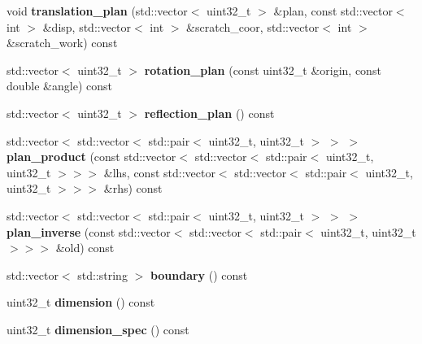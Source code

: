 \begin{DoxyCompactItemize}
void {\bfseries translation\+\_\+plan} (std\+::vector$<$ uint32\+\_\+t $>$ \&plan, const std\+::vector$<$ int $>$ \&disp, std\+::vector$<$ int $>$ \&scratch\+\_\+coor, std\+::vector$<$ int $>$ \&scratch\+\_\+work) const
\item 
\mbox{\label{classqbasis_1_1lattice_ad4f750683c2a56f21ffd395acb1e90f7}} 
std\+::vector$<$ uint32\+\_\+t $>$ {\bfseries rotation\+\_\+plan} (const uint32\+\_\+t \&origin, const double \&angle) const
\item 
\mbox{\label{classqbasis_1_1lattice_a5178ad4d928d458a410defb30b88e750}} 
std\+::vector$<$ uint32\+\_\+t $>$ {\bfseries reflection\+\_\+plan} () const
\item 
\mbox{\label{classqbasis_1_1lattice_ada61775e3ed1bb41bb26c2b20dd0a272}} 
std\+::vector$<$ std\+::vector$<$ std\+::pair$<$ uint32\+\_\+t, uint32\+\_\+t $>$ $>$ $>$ {\bfseries plan\+\_\+product} (const std\+::vector$<$ std\+::vector$<$ std\+::pair$<$ uint32\+\_\+t, uint32\+\_\+t $>$$>$$>$ \&lhs, const std\+::vector$<$ std\+::vector$<$ std\+::pair$<$ uint32\+\_\+t, uint32\+\_\+t $>$$>$$>$ \&rhs) const
\item 
\mbox{\label{classqbasis_1_1lattice_a2bf468a702fce200d990deea197a7306}} 
std\+::vector$<$ std\+::vector$<$ std\+::pair$<$ uint32\+\_\+t, uint32\+\_\+t $>$ $>$ $>$ {\bfseries plan\+\_\+inverse} (const std\+::vector$<$ std\+::vector$<$ std\+::pair$<$ uint32\+\_\+t, uint32\+\_\+t $>$$>$$>$ \&old) const
\item 
\mbox{\label{classqbasis_1_1lattice_a7ea9b7ca95efd6cbb84a03f5e63950d8}} 
std\+::vector$<$ std\+::string $>$ {\bfseries boundary} () const
\item 
\mbox{\label{classqbasis_1_1lattice_a4c06bdbef0aa342f7167cc4dae400bba}} 
uint32\+\_\+t {\bfseries dimension} () const
\item 
\mbox{\label{classqbasis_1_1lattice_a875171b488ac643fb9baffdbf7bb352a}} 
uint32\+\_\+t {\bfseries dimension\+\_\+spec} () const
\item 
\mbox{\label{classqbasis_1_1lattice_ae0bc72c63a5d60e5f0cbb93045041ab7}} 

\end{DoxyCompactItemize}
